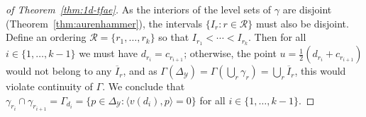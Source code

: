 \documentclass[12pt]{article}
\newcommand{\simplex}{\Delta_\Y}
\newcommand{\R}{\mathcal{R}}
\newcommand{\Y}{\mathcal{Y}}
\newcommand{\inprod}[2]{\langle #1, #2 \rangle}%
\begin{document}
\begin{proof}[of Theorem~\ref{thm:1d-tfae}]
  As the interiors of the level sets of $\gamma$ are disjoint (Theorem~\ref{thm:aurenhammer}), the intervals $\{I_r:r\in\R\}$ must also be disjoint.
  Define an ordering $\R = \{r_1,\ldots,r_k\}$ so that $I_{r_1} < \cdots < I_{r_k}$.
  Then for all $i\in\{1,\ldots,k-1\}$ we must have $d_{r_i} = c_{r_{i+1}}$; otherwise, the point $u = \tfrac 1 2 (d_{r_i} + c_{r_{i+1}})$ would not belong to any $\overline I_r$, and as $\Gamma(\simplex) = \Gamma(\bigcup_r\gamma_r) = \bigcup_r \overline I_r$, this would violate continuity of $\Gamma$.
  We conclude that $\gamma_{r_i}\cap\gamma_{r_{i+1}} = \Gamma_{d_i} = \{p\in\simplex : \inprod{v(d_i)}{p} = 0\}$ for all $i\in\{1,\ldots,k-1\}$.
\end{proof}
\end{document}
